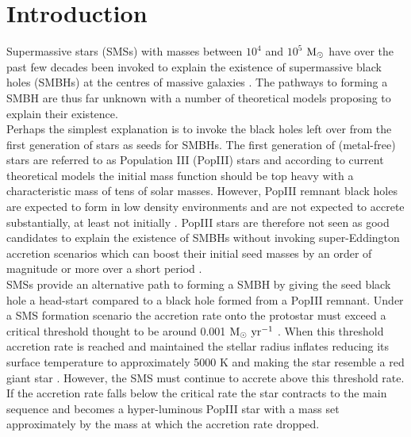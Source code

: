 \documentclass[graphics, twocolumn, usenatbib]{mn2e}
\newcommand{\msolar} {$\rm{M_{\odot}}~$}
\newcommand{\msolaryr} {$\rm{M_{\odot}~yr^{-1}}~$}
\begin{document}
\section{Introduction} \label{Sec:Introduction}
Supermassive stars (SMSs) with masses between $10^4$ and $10^5$ \msolar have over the past few decades been invoked \citep{Rees_1978, Begelman_1978, Begelman_2006,
  Begelman_2008, Latif_2016a, Woods_2018} to explain the existence of supermassive black holes (SMBHs) at the centres of massive galaxies \citep{Fan_06, Kormendy_2013}.
The pathways to forming a SMBH are thus far unknown with a number of theoretical models proposing to explain their existence. \\
\indent Perhaps the
simplest explanation is to invoke the black holes left over from the first 
generation of stars as seeds for SMBHs. The first generation of (metal-free) 
stars are referred to as Population III (PopIII) stars and according to 
current theoretical models \citep[e.g.][]{Turk_2009, Clark_2008, Hirano_2014, Stacy_2016} the initial mass function should be
top heavy with a characteristic mass of tens of solar masses. However, PopIII remnant black holes are expected to form in low
density environments \citep{Whalen_2004, OShea_2005b, Milosavljevic_2009} and are not expected to accrete substantially, at least not 
initially \citep{Alvarez_2009, Smith_2018}. PopIII stars are therefore not seen as good candidates to explain the existence
of SMBHs without invoking super-Eddington accretion scenarios which can boost their initial 
seed masses by an order of magnitude or more over a short period
\citep{Lupi_2014, Pacucci_2015a, Sakurai_2016a,Inayoshi_2016, Pacucci_2017, Inayoshi_2018}.\\
\indent SMSs provide an alternative path to forming a SMBH by giving the seed black hole a
head-start compared to a black hole formed from a PopIII remnant. Under a SMS formation scenario
the accretion rate onto the protostar must exceed a critical threshold thought to be around
0.001 \msolaryr \citep{Haemmerle_2017}. When
this threshold accretion rate is reached and maintained the stellar radius inflates reducing
its surface temperature to approximately 5000 K
and making the star resemble a red giant star
\citep{Omukai_2003, Hosokawa_2012, Hosokawa_2013, Woods_2017}. However, the SMS must continue to
accrete above this threshold rate. If the accretion rate falls below the critical
rate the star contracts to the main sequence and becomes a hyper-luminous PopIII
star with a mass set approximately by the mass at which the accretion rate dropped.
\end{document}
